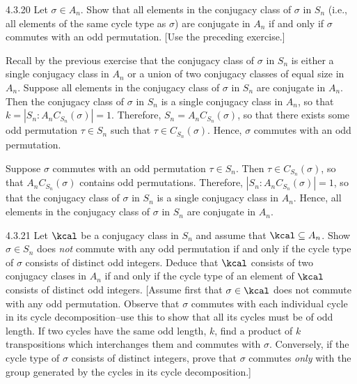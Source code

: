 \begin{exercise}{4.3.20}
	Let $\sigma \in A_n$.
	Show that all elements in the conjugacy class of $\sigma$ in $S_n$ (i.e., all elements of the same cycle type as $\sigma$) are conjugate in $A_n$ if and only if $\sigma$ commutes with an odd permutation. [Use the preceding exercise.]
\end{exercise}

\begin{soliff}
	\rightimp Recall by the previous exercise that the conjugacy class of $\sigma$ in $S_n$ is either a single conjugacy class in $A_n$ or a union of two conjugacy classes of equal size in $A_n$.
	Suppose all elements in the conjugacy class of $\sigma$ in $S_n$ are conjugate in $A_n$.
	Then the conjugacy class of $\sigma$ in $S_n$ is a single conjugacy class in $A_n$, so that $k = |S_n : A_nC_{S_n}(\sigma)| = 1$.
	Therefore, $S_n = A_nC_{S_n}(\sigma)$, so that there exists some odd permutation $\tau \in S_n$ such that $\tau \in C_{S_n}(\sigma)$.
	Hence, $\sigma$ commutes with an odd permutation.

	\leftimp Suppose $\sigma$ commutes with an odd permutation $\tau \in S_n$.
	Then $\tau \in C_{S_n}(\sigma)$, so that $A_nC_{S_n}(\sigma)$ contains odd permutations.
	Therefore, $|S_n : A_nC_{S_n}(\sigma)| = 1$, so that the conjugacy class of $\sigma$ in $S_n$ is a single conjugacy class in $A_n$.
	Hence, all elements in the conjugacy class of $\sigma$ in $S_n$ are conjugate in $A_n$.
\end{soliff}

\begin{spex}{4.3.21}
	Let $\kcal$ be a conjugacy class in $S_n$ and assume that $\kcal \subseteq A_n$.
	Show $\sigma \in S_n$ does \emph{not} commute with any odd permutation if and only if the cycle type of $\sigma$ consists of distinct odd integers.
	Deduce that $\kcal$ consists of two conjugacy clases in $A_n$ if and only if the cycle type of an element of $\kcal$ consists of distinct odd integers. [Assume first that $\sigma \in \kcal$ does not commute with any odd permutation.
	Observe that $\sigma$ commutes with each individual cycle in its cycle decomposition--use this to show that all its cycles must be of odd length.
	If two cycles have the same odd length, $k$, find a product of $k$ transpositions which interchanges them and commutes with $\sigma$.
	Conversely, if the cycle type of $\sigma$ consists of distinct integers, prove that $\sigma$ commutes \emph{only} with the group generated by the cycles in its cycle decomposition.]
\end{spex}

